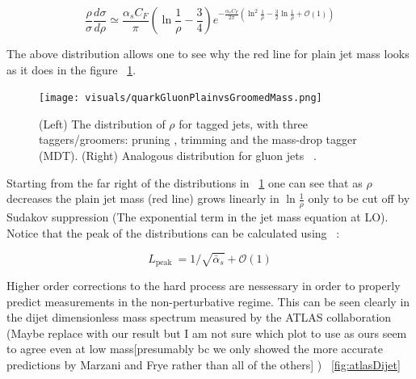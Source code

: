\begin{equation}
\frac{\rho}{\sigma} \frac{d \sigma}{d \rho} \simeq \frac{\alpha_{s} C_{F}}{\pi}\left(\ln \frac{1}{\rho}-\frac{3}{4}\right) e^{-\frac{\alpha_{s} C_{F}}{2 \pi}\left(\ln ^{2} \frac{1}{\rho}-\frac{3}{2} \ln \frac{1}{\rho}+\mathcal{O}(1)\right)}
\end{equation}

The above distribution allows one to see why the red line for plain jet mass looks as it does in the figure ~\ref{fig:quarkGluonPlainvsGroomedMass}.

\begin{figure}[htb]
\centering
\texttt{[image: visuals/quarkGluonPlainvsGroomedMass.png]}
\caption{(Left) The distribution of $\rho$ for tagged jets, with three taggers/groomers: pruning , trimming and the mass-drop tagger (MDT). (Right) Analogous distribution for gluon jets ~\cite{mmdt}.}
\label{fig:quarkGluonPlainvsGroomedMass}
\end{figure}



 Starting from the far right of the distributions in ~\ref{fig:quarkGluonPlainvsGroomedMass} one can see that as $\rho$ decreases the plain jet mass (red line) grows linearly in $\ln \frac{1}{\rho}$ only to be cut off by Sudakov suppression (The exponential term in the jet mass equation at LO). Notice that the peak of the distributions can be calculated using ~\cite{mmdt}:\newline

\begin{equation}
L_{\text {peak }}=1 / \sqrt{\bar{\alpha}_{s}}+\mathcal{O}(1)
\end{equation}
 




Higher order corrections to the hard process are nessessary in order to properly predict measurements in the non-perturbative regime. This can be seen clearly in the dijet dimensionless mass spectrum measured by the ATLAS collaboration (Maybe replace with our result but I am not sure which plot to use as ours seem to agree even at low mass[presumably bc we only showed the more accurate predictions by Marzani and Frye rather than all of the others] ) ~\ref{fig:atlasDijet}


